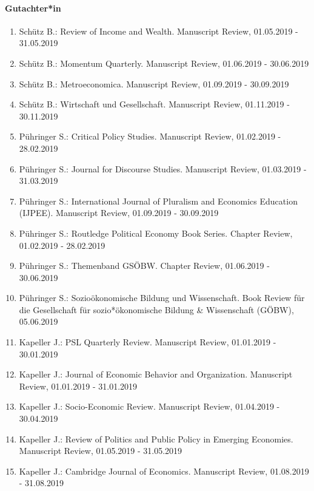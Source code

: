 \paragraph{Gutachter*in}
\begin{enumerate}[leftmargin=*, labelsep=0.5cm]
\item Schütz B.: Review of Income and Wealth. Manuscript Review, 01.05.2019 - 31.05.2019
\item Schütz B.: Momentum Quarterly. Manuscript Review, 01.06.2019 - 30.06.2019
\item Schütz B.: Metroeconomica. Manuscript Review, 01.09.2019 - 30.09.2019
\item Schütz B.: Wirtschaft und Gesellschaft. Manuscript Review, 01.11.2019 - 30.11.2019
\item Pühringer S.: Critical Policy Studies. Manuscript Review, 01.02.2019 - 28.02.2019
\item Pühringer S.: Journal for Discourse Studies. Manuscript Review, 01.03.2019 - 31.03.2019
\item Pühringer S.: International Journal of Pluralism and Economics Education (IJPEE). Manuscript Review, 01.09.2019 - 30.09.2019
\item Pühringer S.: Routledge Political Economy Book Series. Chapter Review, 01.02.2019 - 28.02.2019
\item Pühringer S.: Themenband GSÖBW. Chapter Review, 01.06.2019 - 30.06.2019
\item Pühringer S.: Sozioökonomische Bildung und Wissenschaft. Book Review für die Gesellschaft für sozio*ökonomische Bildung \& Wissenschaft (GÖBW), 05.06.2019
\item Kapeller J.: PSL Quarterly Review. Manuscript Review, 01.01.2019 - 30.01.2019
\item Kapeller J.: Journal of Economic Behavior and Organization. Manuscript Review, 01.01.2019 - 31.01.2019
\item Kapeller J.: Socio-Economic Review. Manuscript Review, 01.04.2019 - 30.04.2019
\item Kapeller J.: Review of Politics and Public Policy in Emerging Economies. Manuscript Review, 01.05.2019 - 31.05.2019
\item Kapeller J.: Cambridge Journal of Economics. Manuscript Review, 01.08.2019 - 31.08.2019
\end{enumerate}

